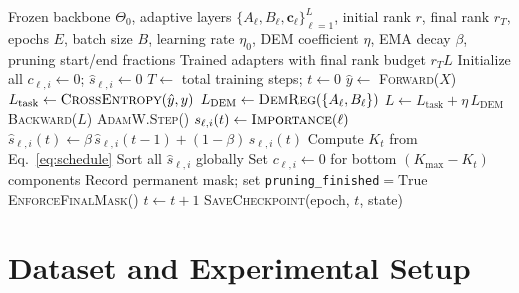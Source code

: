 \documentclass[conference]{IEEEtran}
\begin{document}
\begin{algorithm}[t]
\caption{Dynamic rank adaptation training procedure}
\label{alg:train}
\begin{algorithmic}[1]
\Require Frozen backbone $\Theta_0$, adaptive layers
  $\{A_\ell, B_\ell, \mathbf{c}_\ell\}_{\ell=1}^{L}$,
  initial rank $r$, final rank $r_T$, epochs $E$, batch
  size $B$, learning rate $\eta_0$, DEM coefficient $\eta$,
  EMA decay $\beta$, pruning start/end fractions
\Ensure Trained adapters with final rank budget $r_T L$
\State Initialize all $c_{\ell,i} \leftarrow 0$;
  $\hat{s}_{\ell,i} \leftarrow 0$
\State $T \leftarrow$ total training steps; $t \leftarrow 0$
    \State $\hat{y} \leftarrow$ \textsc{Forward}($X$)
    \State $L_{\text{task}} \leftarrow
      \textsc{CrossEntropy}(\hat{y}, y)$
    \State $L_{\text{DEM}} \leftarrow
      \textsc{DemReg}(\{A_\ell, B_\ell\})$
    \State $L \leftarrow L_{\text{task}} + \eta\,L_{\text{DEM}}$
    \State \textsc{Backward}($L$)
    \State \textsc{AdamW.Step}()
      \State $s_{\ell,i}(t) \leftarrow
        \textsc{Importance}(\ell)$
      \State $\hat{s}_{\ell,i}(t) \leftarrow
        \beta\,\hat{s}_{\ell,i}(t{-}1)
        + (1{-}\beta)\,s_{\ell,i}(t)$
    \EndFor
      \State Compute $K_t$ from Eq.~\eqref{eq:schedule}
      \State Sort all $\hat{s}_{\ell,i}$ globally
      \State Set $c_{\ell,i} \leftarrow 0$ for
        bottom $(K_{\max} - K_t)$ components
        \State Record permanent mask; set
          \texttt{pruning\_finished}$= \mathrm{True}$
      \EndIf
    \EndIf
      \State \textsc{EnforceFinalMask}()
    \EndIf
    \State $t \leftarrow t + 1$
  \EndFor
  \State \textsc{SaveCheckpoint}(epoch, $t$, state)
\EndFor
\end{algorithmic}
\end{algorithm}

\section{Dataset and Experimental Setup}
\label{sec:exp}
\end{document}
